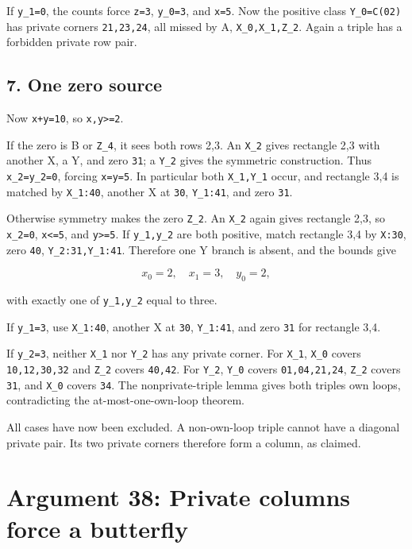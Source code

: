 \documentclass[
  10pt,
]{article}
\begin{document}
If \texttt{y\_1=0}, the counts force \texttt{z=3}, \texttt{y\_0=3}, and
\texttt{x=5}. Now the positive class \texttt{Y\_0=C(02)} has private
corners \texttt{21,23,24}, all missed by A, \texttt{X\_0,X\_1,Z\_2}.
Again a triple has a forbidden private row pair.

\hypertarget{one-zero-source-1}{%
\subsection*{7. One zero source}\label{one-zero-source-1}}

Now \texttt{x+y=10}, so \texttt{x,y\textgreater{}=2}.

If the zero is B or \texttt{Z\_4}, it sees both rows 2,3. An
\texttt{X\_2} gives rectangle 2,3 with another X, a Y, and zero
\texttt{31}; a \texttt{Y\_2} gives the symmetric construction. Thus
\texttt{x\_2=y\_2=0}, forcing \texttt{x=y=5}. In particular both
\texttt{X\_1,Y\_1} occur, and rectangle 3,4 is matched by
\texttt{X\_1:40}, another X at \texttt{30}, \texttt{Y\_1:41}, and zero
\texttt{31}.

Otherwise symmetry makes the zero \texttt{Z\_2}. An \texttt{X\_2} again
gives rectangle 2,3, so \texttt{x\_2=0}, \texttt{x\textless{}=5}, and
\texttt{y\textgreater{}=5}. If \texttt{y\_1,y\_2} are both positive,
match rectangle 3,4 by \texttt{X:30}, zero \texttt{40},
\texttt{Y\_2:31,Y\_1:41}. Therefore one Y branch is absent, and the
bounds give

\[
x_0=2,\quad x_1=3,\quad y_0=2,
\]

with exactly one of \texttt{y\_1,y\_2} equal to three.

If \texttt{y\_1=3}, use \texttt{X\_1:40}, another X at \texttt{30},
\texttt{Y\_1:41}, and zero \texttt{31} for rectangle 3,4.

If \texttt{y\_2=3}, neither \texttt{X\_1} nor \texttt{Y\_2} has any
private corner. For \texttt{X\_1}, \texttt{X\_0} covers
\texttt{10,12,30,32} and \texttt{Z\_2} covers \texttt{40,42}. For
\texttt{Y\_2}, \texttt{Y\_0} covers \texttt{01,04,21,24}, \texttt{Z\_2}
covers \texttt{31}, and \texttt{X\_0} covers \texttt{34}. The
nonprivate-triple lemma gives both triples own loops, contradicting the
at-most-one-own-loop theorem.

All cases have now been excluded. A non-own-loop triple cannot have a
diagonal private pair. Its two private corners therefore form a column,
as claimed.

\hypertarget{arg-38}{%
\section{Argument 38: Private columns force a butterfly}\label{arg-38}}
\end{document}
